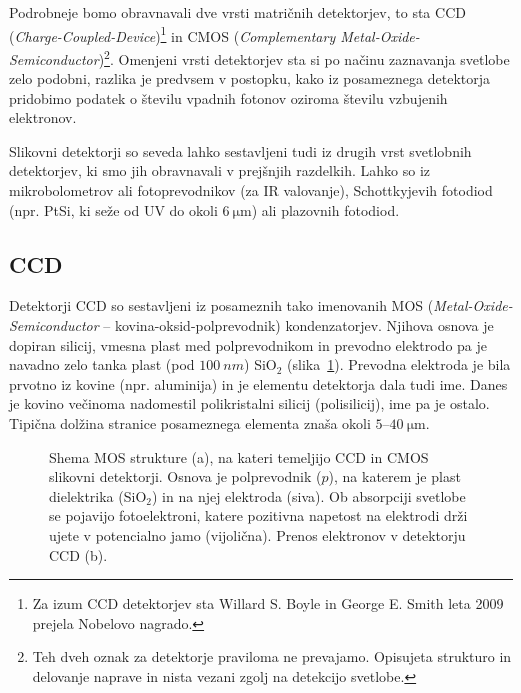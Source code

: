 Podrobneje bomo obravnavali dve vrsti matričnih detektorjev, to sta CCD 
({\it Charge-Coupled-Device})\footnote{Za izum CCD detektorjev sta Willard 
S. Boyle in George E. Smith  leta 2009 prejela Nobelovo nagrado.} 
in CMOS ({\it Complementary Metal-Oxide-Semiconductor})\footnote{Teh 
dveh oznak za detektorje praviloma ne prevajamo. Opisujeta 
strukturo in delovanje naprave in nista vezani zgolj na detekcijo svetlobe.}. Omenjeni vrsti
detektorjev sta si po načinu zaznavanja svetlobe zelo podobni, razlika
je predvsem v postopku, kako iz posameznega detektorja pridobimo podatek o številu 
vpadnih fotonov oziroma številu vzbujenih elektronov.

\begin{remark}
Slikovni detektorji so seveda lahko sestavljeni tudi iz drugih vrst svetlobnih detektorjev, 
ki smo jih obravnavali v prejšnjih razdelkih. Lahko so iz mikrobolometrov
ali fotoprevodnikov (za IR valovanje),
Schottkyjevih fotodiod (npr. PtSi, ki seže od UV do
okoli $6~\si{\micro\meter}$) ali plazovnih fotodiod.
\end{remark}

\subsection*{CCD}
Detektorji CCD so sestavljeni iz posameznih tako imenovanih MOS 
({\it Metal-Oxide-Semiconductor}
-- kovina-oksid-polprevodnik) kondenzatorjev. Njihova osnova je dopiran silicij, vmesna 
plast med polprevodnikom in prevodno elektrodo pa je navadno zelo tanka plast (pod $100~\si{nm}$)
SiO$_2$ (slika~\ref{11_MOS}).
Prevodna elektroda je bila prvotno iz kovine (npr. aluminija) in je elementu detektorja dala tudi ime.
Danes je kovino večinoma nadomestil polikristalni silicij (polisilicij), ime pa je ostalo.
Tipična dolžina stranice posameznega elementa znaša okoli $5$--$40~\si{\micro\meter}$. 
\begin{figure}[h!]
\centering
\def\svgwidth{140truemm} 

\caption{Shema MOS strukture (a), na kateri temeljijo CCD in CMOS slikovni detektorji. Osnova je 
polprevodnik ($p$), na katerem je plast dielektrika (SiO$_2$) in na njej elektroda (siva). 
Ob absorpciji svetlobe se pojavijo fotoelektroni, katere pozitivna napetost
na elektrodi drži ujete v potencialno jamo (vijolična). Prenos elektronov v detektorju CCD (b).}
\label{11_MOS}
\end{figure}

